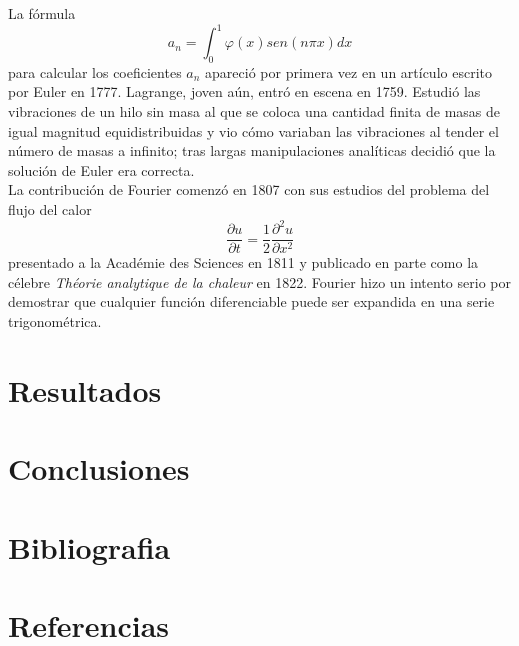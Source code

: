 \documentclass[a4paper,12pt]{article}
\begin{document}
\indent La fórmula
\[ a_n = \int_0^1 \varphi(x)sen\left(n\pi x\right)dx \]
para calcular los coeficientes $a_n$ apareció por primera vez en un artículo escrito por Euler en 1777.
\indent Lagrange, joven aún, entró en escena en 1759. Estudió las vibraciones de un hilo sin masa al que se coloca una cantidad finita de masas de igual magnitud equidistribuidas y vio cómo variaban las vibraciones al tender el
número de masas a infinito; tras largas manipulaciones analíticas decidió que la solución de Euler era correcta.\\
\indent La contribución de Fourier comenzó en 1807 con sus estudios del problema
del flujo del calor
\[ \frac{\partial u}{\partial t} = \frac{1}{2}\frac{\partial^2u}{\partial x^2} \]
presentado a la Académie des Sciences en 1811 y publicado en parte como la célebre \textit{Théorie analytique de la chaleur} en 1822. Fourier hizo un intento serio por demostrar que cualquier función diferenciable puede ser expandida
en una serie trigonométrica.

\section{Resultados}

\section{Conclusiones}

\section{Bibliografia}

\section{Referencias}
\end{document}
